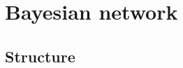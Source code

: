 \documentclass[a4paper,10pt]{report}
\begin{document}



{\let\clearpage\relax\par \chapter{Bayesian network}\label{chap:chapter-4}}

\section{Structure}\label{sec:section-41}
\end{document}
